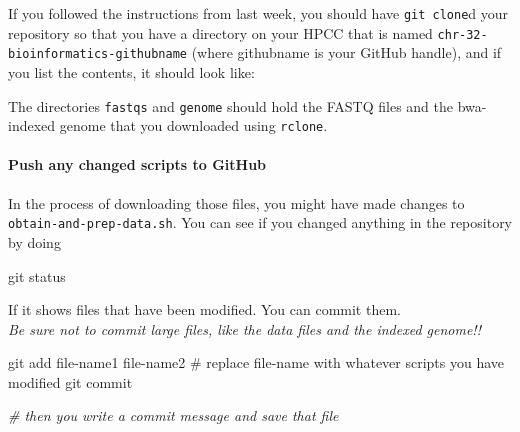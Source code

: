 \documentclass[]{krantz}
\makeatletter
\newenvironment{Shaded}{\begin{snugshade}}{\end{snugshade}}
\newcommand{\CommentTok}[1]{\textcolor[rgb]{0.37,0.37,0.37}{\textit{#1}}}
\newcommand{\ExtensionTok}[1]{#1}
\newcommand{\FunctionTok}[1]{\textcolor[rgb]{0,0,0}{#1}}
\newcommand{\KeywordTok}[1]{\textcolor[rgb]{0.27,0.27,0.27}{\textbf{#1}}}
\newcommand{\NormalTok}[1]{#1}
\let\oldparagraph\paragraph
\renewcommand{\paragraph}[1]{\oldparagraph{#1}\mbox{}}
\newenvironment{kframe}{%
\medskip{}
\setlength{\fboxsep}{.8em}
 \def\at@end@of@kframe{}%
 \ifinner\ifhmode%
  \def\at@end@of@kframe{\end{minipage}}%
  \begin{minipage}{\columnwidth}%
 \fi\fi%
 \def\FrameCommand##1{\hskip\@totalleftmargin \hskip-\fboxsep
 \colorbox{shadecolor}{##1}\hskip-\fboxsep
     \hskip-\linewidth \hskip-\@totalleftmargin \hskip\columnwidth}%
 \MakeFramed {\advance\hsize-\width
   \@totalleftmargin\z@ \linewidth\hsize
   \@setminipage}}%
 {\par\unskip\endMakeFramed%
 \at@end@of@kframe}
\renewenvironment{Shaded}{\begin{kframe}}{\end{kframe}}
\makeatother
\begin{document}
If you followed the instructions from last week, you should have \texttt{git\ clone}d your
repository so that you have a directory on your HPCC that is named
\texttt{chr-32-bioinformatics-githubname} (where githubname is your GitHub handle), and if you
list the contents, it should look like:

\begin{Shaded}
\end{Shaded}

The directories \texttt{fastqs} and \texttt{genome} should hold the FASTQ files and the
bwa-indexed genome that you downloaded using \texttt{rclone}.

\hypertarget{push-any-changed-scripts-to-github}{%
\paragraph{Push any changed scripts to GitHub}\label{push-any-changed-scripts-to-github}}

In the process of downloading those files, you might have made changes to
\texttt{obtain-and-prep-data.sh}. You can see if you changed anything in the repository
by doing

\begin{Shaded}
\begin{Highlighting}[]
\FunctionTok{git}\NormalTok{ status}
\end{Highlighting}
\end{Shaded}

If it shows files that have been modified. You can commit them.\\
\emph{Be sure not to commit large files, like the data files and the indexed genome!!}

\begin{Shaded}
\begin{Highlighting}[]
\FunctionTok{git}\NormalTok{ add file-name1 file-name2  # replace file-name with whatever scripts you have modified}
\FunctionTok{git}\NormalTok{ commit}

\CommentTok{# then you write a commit message and save that file}
\end{Highlighting}
\end{Shaded}
\end{document}
